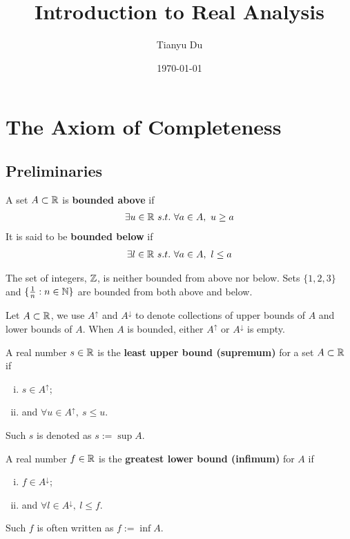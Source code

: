 \documentclass[11pt]{article}
\title{Introduction to Real Analysis}
\date{\today}
\author{Tianyu Du}
\begin{document}
	\maketitle
	\doclicenseThis
	\tableofcontents
	\newpage
	\section{The Axiom of Completeness}
	\subsection{Preliminaries}
	\begin{definition}
		A set $A \subset \mathbb{R}$ is \textbf{bounded above} if
		\begin{align}
			\exists u \in \mathbb{R}\ s.t.\ \forall a \in A,\ u \geq a
		\end{align} 
		It is said to be \textbf{bounded below} if
		\begin{align}
			\exists l \in \mathbb{R}\ s.t.\ \forall a \in A,\ l \leq a
		\end{align}
	\end{definition}
	
	\begin{example}
		The set of integers, $\mathbb{Z}$, is neither bounded from above nor below. Sets $\{1, 2, 3\}$ and $\{\frac{1}{n}: n \in \mathbb{N} \}$ are bounded from both above and below.
	\end{example}
	
	\begin{notation}
		Let $A \subset \mathbb{R}$, we use $A^\uparrow$ and $A^\downarrow$ to denote collections of upper bounds of $A$ and lower bounds of $A$. When $A$ is bounded, either $A^\uparrow$ or $A^\downarrow$ is empty.
	\end{notation}
	
	\begin{definition}
		A real number $s \in \mathbb{R}$ is the \textbf{least upper bound (supremum)} for a set $A \subset \mathbb{R}$ if 
		\begin{enumerate}[(i)]
			\item $s \in A^\uparrow$;
			\item and $\forall u \in A^\uparrow,\ s \leq u$.
		\end{enumerate} Such $s$ is denoted as $s := \sup A$.
	\end{definition}
	
	\begin{definition}
		A real number $f \in \mathbb{R}$ is the \textbf{greatest lower bound (infimum)} for $A$ if 
		\begin{enumerate}[(i)]
			\item $f \in A^\downarrow$;
			\item and $\forall l \in A^\downarrow,\ l \leq f$.	
		\end{enumerate}
		Such $f$ is often written as $f := \inf A$.
	\end{definition}
	
\end{document}

